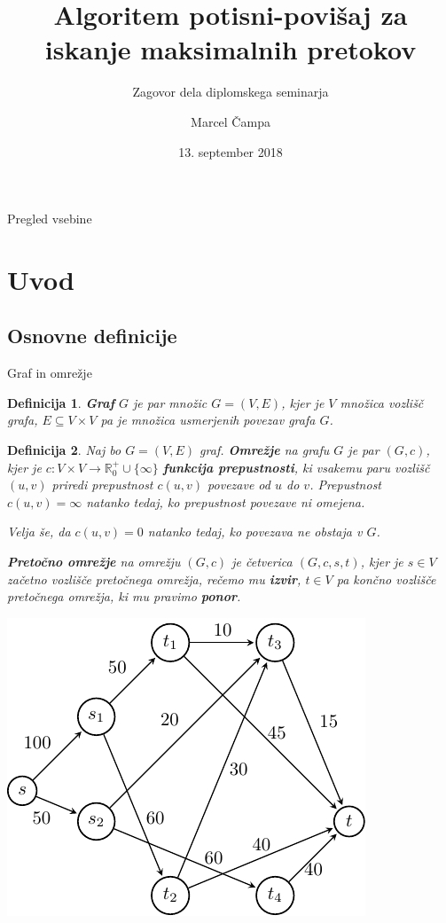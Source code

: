 \documentclass{beamer}
\title[Algoritem potisni-povišaj]{Algoritem potisni-povišaj za iskanje maksimalnih pretokov}
\subtitle{Zagovor dela diplomskega seminarja}
\author{Marcel Čampa}
\date{13. september 2018}
\institute[FMF UL]{Fakulteta za matematiko in fiziko Univerze v Ljubljani}
\newtheorem{definicija}{Definicija}
\begin{document}
\begin{frame}
\maketitle
\end{frame}

\begin{frame}{Pregled vsebine}
\tableofcontents
\end{frame}


\section{Uvod}

\subsection{Osnovne definicije}
\begin{frame}{Graf in omrežje}
    \begin{definicija}
    \textbf{Graf} $G$ je par množic $G = (V,E)$, kjer je $V$ množica vozlišč grafa, $E \subseteq V \times V$ pa je množica usmerjenih povezav grafa $G$.
    \end{definicija}

    \begin{definicija}
    Naj bo $G = (V, E)$ graf. \textbf{Omrežje} na grafu $G$ je par $(G, c)$, kjer je $c \colon V \times V \rightarrow \mathbb{R}^+_0 \cup \{\infty\}$ \textbf{funkcija prepustnosti}, ki vsakemu paru vozlišč $(u,v)$ priredi prepustnost $c(u,v)$ povezave od $u$ do $v$. Prepustnost $c(u,v) = \infty$ natanko tedaj, ko prepustnost povezave ni omejena.

    Velja še, da $c(u,v)=0$ natanko tedaj, ko povezava ne obstaja v $G$.

    \textbf{Pretočno omrežje} na omrežju $(G,c)$ je četverica $(G,c,s,t)$, kjer je $s\in V$ začetno vozlišče pretočnega omrežja, rečemo mu \textbf{izvir}, $t\in V$ pa končno vozlišče pretočnega omrežja, ki mu pravimo \textbf{ponor}.
    \end{definicija}
\end{frame}

\begin{frame}
    \centering
    \includegraphics{../writing/images/primer1-1.pdf}
\end{frame}
\end{document}
